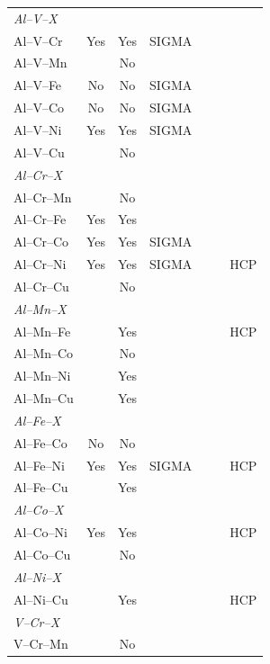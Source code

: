 \documentclass[final,5p,times,twocolumn]{elsarticle}
\begin{document}
\begin{longtable}{lcccccc}
\multicolumn{7}{l}{\textit{Al--V--X}} \\
Al--V--Cr   & Yes & Yes &  SIGMA &     &     &     \\
Al--V--Mn   &     & No  &        &     &     &     \\
Al--V--Fe   & No  & No  &  SIGMA &     &     &     \\
Al--V--Co   & No  & No  &  SIGMA &     &     &     \\
Al--V--Ni   & Yes & Yes &  SIGMA &     &     &     \\
Al--V--Cu   &     & No  &        &     &     &     \\
\hline
\multicolumn{7}{l}{\textit{Al--Cr--X}} \\
Al--Cr--Mn  &     & No  &        &     &     &     \\
Al--Cr--Fe  & Yes & Yes &        &     &     &     \\
Al--Cr--Co  & Yes & Yes &  SIGMA &     &     &     \\
Al--Cr--Ni  & Yes & Yes &  SIGMA &     &     & HCP \\
Al--Cr--Cu  &     & No  &        &     &     &     \\
\hline
\multicolumn{7}{l}{\textit{Al--Mn--X}} \\
Al--Mn--Fe  &     & Yes &        &     &     & HCP \\
Al--Mn--Co  &     & No  &        &     &     &     \\
Al--Mn--Ni  &     & Yes &        &     &     &     \\
Al--Mn--Cu  &     & Yes &        &     &     &     \\
\hline
\multicolumn{7}{l}{\textit{Al--Fe--X}} \\
Al--Fe--Co  & No  & No  &        &     &     &     \\
Al--Fe--Ni  & Yes & Yes &  SIGMA &     &     & HCP \\
Al--Fe--Cu  &     & Yes &        &     &     &     \\
\hline
\multicolumn{7}{l}{\textit{Al--Co--X}} \\
Al--Co--Ni  & Yes & Yes &        &     &     & HCP \\
Al--Co--Cu  &     & No  &        &     &     &     \\
\hline
\multicolumn{7}{l}{\textit{Al--Ni--X}} \\
Al--Ni--Cu  &     & Yes &        &     &     & HCP \\
\hline
\multicolumn{7}{l}{\textit{V--Cr--X}} \\
V--Cr--Mn   &     & No  &        &     &     &     \\

\end{longtable}
\end{document}
